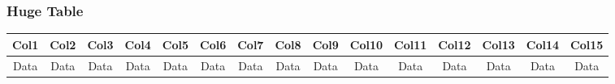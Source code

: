 \begin{frame}
\frametitle{Huge Table}
\begin{table}
\begin{tabular}{|c|c|c|c|c|c|c|c|c|c|c|c|c|c|c|}
\hline
Col1 & Col2 & Col3 & Col4 & Col5 & Col6 & Col7 & Col8 & Col9 & Col10 & Col11 & Col12 & Col13 & Col14 & Col15 \\
\hline
Data & Data & Data & Data & Data & Data & Data & Data & Data & Data & Data & Data & Data & Data & Data \\
\hline
\end{tabular}
\end{table}
\end{frame}

